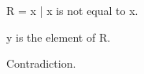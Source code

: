 
\begin{forthel}
  \begin{definition}
    R = {x | x is not equal to x}.
  \end{definition}

  \begin{definition}
    y is the element of R.
  \end{definition}

  \begin{theorem}
    Contradiction.
  \end{theorem}
\end{forthel}
